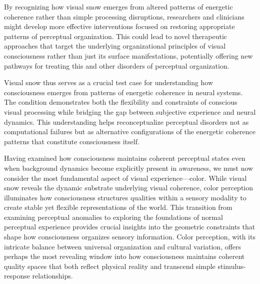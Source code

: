 By recognizing how visual snow emerges from altered patterns of energetic coherence rather than simple processing disruptions, researchers and clinicians might develop more effective interventions focused on restoring appropriate patterns of perceptual organization. This could lead to novel therapeutic approaches that target the underlying organizational principles of visual consciousness rather than just its surface manifestations, potentially offering new pathways for treating this and other disorders of perceptual organization.

Visual snow thus serves as a crucial test case for understanding how consciousness emerges from patterns of energetic coherence in neural systems. The condition demonstrates both the flexibility and constraints of conscious visual processing while bridging the gap between subjective experience and neural dynamics. This understanding helps reconceptualize perceptual disorders not as computational failures but as alternative configurations of the energetic coherence patterns that constitute consciousness itself.

Having examined how consciousness maintains coherent perceptual states even when background dynamics become explicitly present in awareness, we must now consider the most fundamental aspect of visual experience—color. While visual snow reveals the dynamic substrate underlying visual coherence, color perception illuminates how consciousness structures qualities within a sensory modality to create stable yet flexible representations of the world. This transition from examining perceptual anomalies to exploring the foundations of normal perceptual experience provides crucial insights into the geometric constraints that shape how consciousness organizes sensory information. Color perception, with its intricate balance between universal organization and cultural variation, offers perhaps the most revealing window into how consciousness maintains coherent quality spaces that both reflect physical reality and transcend simple stimulus-response relationships.
